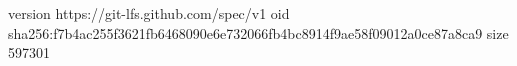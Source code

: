 version https://git-lfs.github.com/spec/v1
oid sha256:f7b4ac255f3621fb6468090e6e732066fb4bc8914f9ae58f09012a0ce87a8ca9
size 597301
